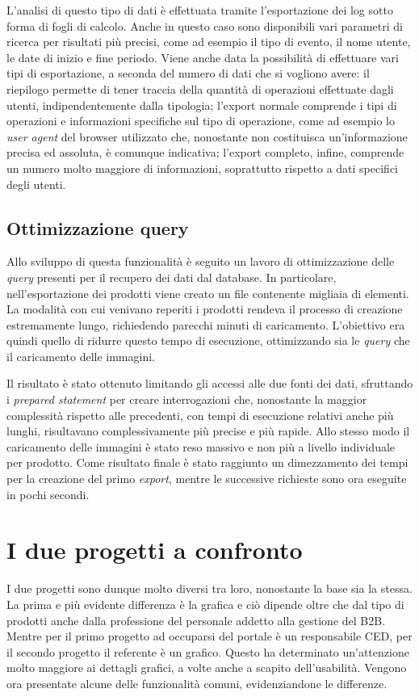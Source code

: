 L'analisi di questo tipo di dati è effettuata tramite l'esportazione dei log sotto forma di fogli di calcolo. Anche in questo caso sono disponibili vari parametri di ricerca per risultati più precisi, come ad esempio il tipo di evento, il nome utente, le date di inizio e fine periodo. Viene anche data la possibilità di effettuare vari tipi di esportazione, a seconda del numero di dati che si vogliono avere: il riepilogo permette di tener traccia della quantità di operazioni effettuate dagli utenti, indipendentemente dalla tipologia; l'export normale comprende i tipi di operazioni e informazioni specifiche sul tipo di operazione, come ad esempio lo \textit{user agent} del browser utilizzato che, nonostante non costituisca un'informazione precisa ed assoluta, è comunque indicativa; l'export completo, infine, comprende un numero molto maggiore di informazioni, soprattutto rispetto a dati specifici degli utenti.

\subsection{Ottimizzazione query}
Allo sviluppo di questa funzionalità è seguito un lavoro di ottimizzazione delle \textit{query} presenti per il recupero dei dati dal database. In particolare, nell'esportazione dei prodotti viene creato un file contenente migliaia di elementi. La modalità con cui venivano reperiti i prodotti rendeva il processo di creazione estremamente lungo, richiedendo parecchi minuti di caricamento. L'obiettivo era quindi quello di ridurre questo tempo di esecuzione, ottimizzando sia le \textit{query} che il caricamento delle immagini. 

Il risultato è stato ottenuto limitando gli accessi alle due fonti dei dati, sfruttando i \textit{prepared statement} per creare interrogazioni che, nonostante la maggior complessità rispetto alle precedenti, con tempi di esecuzione relativi anche più lunghi, risultavano complessivamente più precise e più rapide. Allo stesso modo il caricamento delle immagini è stato reso massivo e non più a livello individuale per prodotto. Come risultato finale è stato raggiunto un dimezzamento dei tempi per la creazione del primo \textit{export}, mentre le successive richieste sono ora eseguite in pochi secondi.

\section{I due progetti a confronto}
I due progetti sono dunque molto diversi tra loro, nonostante la base sia la stessa. La prima e più evidente differenza è la grafica e ciò dipende oltre che dal tipo di prodotti anche dalla professione del personale addetto alla gestione del B2B. Mentre per il primo progetto ad occuparsi del portale è un responsabile \Gls{CED}, per il secondo progetto il referente è un grafico. Questo ha determinato un'attenzione molto maggiore ai dettagli grafici, a volte anche a scapito dell'usabilità. Vengono ora presentate alcune delle funzionalità comuni, evidenziandone le differenze.

